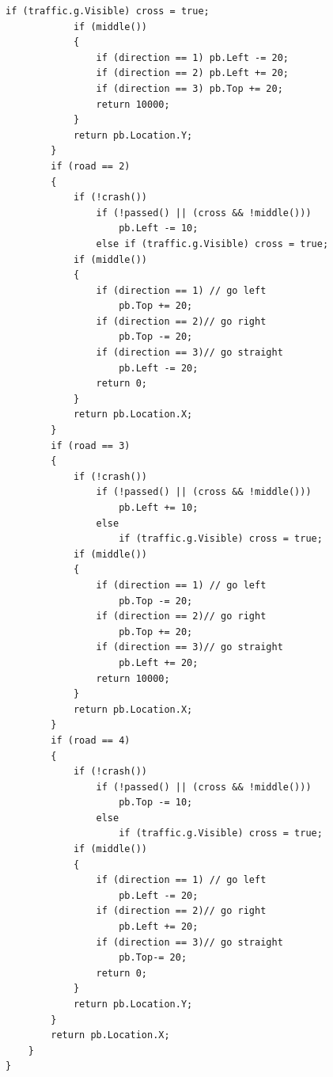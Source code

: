 \begin{lstlisting}[caption = Класс car, label = {lst:car}]
                    if (traffic.g.Visible) cross = true;
            if (middle())
            {
                if (direction == 1) pb.Left -= 20; 
                if (direction == 2) pb.Left += 20;
                if (direction == 3) pb.Top += 20;
                return 10000;
            }
            return pb.Location.Y;                    
        }
        if (road == 2)
        {
            if (!crash())
                if (!passed() || (cross && !middle()))
                    pb.Left -= 10;
                else if (traffic.g.Visible) cross = true;
            if (middle())
            {
                if (direction == 1) // go left
                    pb.Top += 20;
                if (direction == 2)// go right
                    pb.Top -= 20;
                if (direction == 3)// go straight
                    pb.Left -= 20;
                return 0;
            }
            return pb.Location.X;
        }
        if (road == 3)
        {
            if (!crash())
                if (!passed() || (cross && !middle()))
                    pb.Left += 10;
                else
                    if (traffic.g.Visible) cross = true;
            if (middle())
            {
                if (direction == 1) // go left
                    pb.Top -= 20;
                if (direction == 2)// go right
                    pb.Top += 20;
                if (direction == 3)// go straight
                    pb.Left += 20;
                return 10000;
            }
            return pb.Location.X;
        }
        if (road == 4)
        {
            if (!crash())
                if (!passed() || (cross && !middle()))
                    pb.Top -= 10;
                else
                    if (traffic.g.Visible) cross = true;
            if (middle())
            {
                if (direction == 1) // go left
                    pb.Left -= 20;
                if (direction == 2)// go right
                    pb.Left += 20;
                if (direction == 3)// go straight
                    pb.Top-= 20;
                return 0;
            }
            return pb.Location.Y;
        }
        return pb.Location.X;
    }
}
\end{lstlisting}

